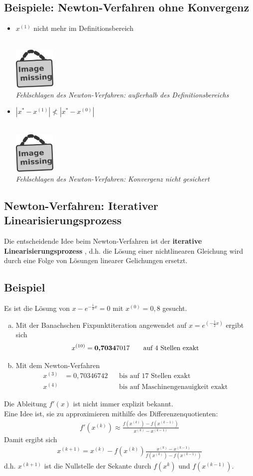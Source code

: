 \documentclass[ngerman,fontsize=11pt, paper=a4, parskip=half, titlepage=true, toc=bib]{scrbook}
\newcommand{\imagemissing}[1]{
  \begin{center}~\\
    \centering 
    \includegraphics[width=2cm]{images/image_missing.jpg}\\
    \textit{#1} \\
  \end{center}
}
\begin{document}

  \subsection{Beispiele: Newton-Verfahren ohne Konvergenz}
  \begin{itemize}
  \item $x^{(1)}$ nicht mehr im Definitionsbereich
    \imagemissing{Fehlschlagen des Newton-Verfahren: außerhalb des Definitionsbereichs}
  \item $|x^{*}-x^{(1)}| \nless |x^{*}-x^{(0)}| $
    \imagemissing{Fehlschlagen des Newton-Verfahren: Konvergenz nicht gesichert}
  \end{itemize}
  
  \subsection{Newton-Verfahren: Iterativer Linearisierungsprozess}
  Die entscheidende Idee beim Newton-Verfahren ist der \textbf{iterative Linearisierungsprozess}
  , d.h. die Lösung einer nichtlinearen Gleichung wird
  durch eine Folge von Lösungen linearer Gelichungen ersetzt.
  
  \subsection{Beispiel}\label{5.4.6}
  Es ist die Lösung von $x-e^{-\frac{1}{2}x}=0$ mit $x^{(0)}=0,8$ gesucht.
  \begin{enumerate}[a)]
  \item Mit der Banachschen Fixpunktiteration angewendet auf 
    $x=e^{(-\frac{1}{2}x)}$ ergibt sich
    \begin{gather*}
      x^{(10)}=\text{\bfseries 0,7034}7017 
      \qquad \text{auf 4 Stellen exakt}
    \end{gather*}
  \item Mit dem Newton-Verfahren
    \begin{align*}
      x^{(3)}&= 0,70346742 &&\text{bis auf 17 Stellen exakt}\\
      x^{(4)} &&& \text{bis auf Maschinengenauigkeit exakt}
    \end{align*}		
  \end{enumerate}
  Die Ableitung $f'(x)$ ist nicht immer explizit bekannt. \\
  Eine Idee ist, sie zu approximieren mithilfe des Differenzenquotienten:
  \begin{gather*}
    f'(x^{(k)})  \approx \frac{f(x^{(k)})-f(x^{(k-1)})}{x^{(k)}-x^{(k-1)}}
  \end{gather*}
  Damit ergibt sich
  \begin{gather*}
    x^{(k+1)} = x^{(k)}-f(x^{(k)}) \frac{x^{(k)} - x^{(k-1)}}{f(x^{(k)})-f(x^{(k-1)})}
  \end{gather*}
  d.h. $x^{(k+1)} $ ist die Nullstelle der Sekante durch $f(x^{k})$ und $f(x^{(k-1)})$.
  
\end{document}
